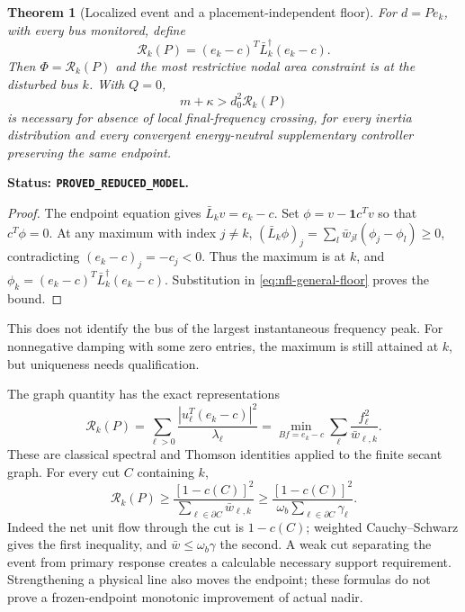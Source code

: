\documentclass[11pt]{article}
\newtheorem{theorem}{Theorem}
\newcommand{\one}{\mathbf{1}}
\newcommand{\status}[1]{\par\smallskip\noindent\textbf{Status: \texttt{#1}.}\ }
\begin{document}
\begin{theorem}[Localized event and a placement-independent floor]
For $d=P e_k$, with every bus monitored, define
\begin{equation}
 \mathcal R_k(P)=(e_k-c)^T\bar L_k^\dagger(e_k-c).
 \label{eq:nfl-resistance}
\end{equation}
Then $\Phi=\mathcal R_k(P)$ and the most restrictive nodal \emph{area}
constraint is at the disturbed bus $k$. With $Q=0$,
\begin{equation}
 \boxed{m+\kappa>d_0^2\mathcal R_k(P)}
 \label{eq:nfl-local-floor}
\end{equation}
is necessary for absence of local final-frequency crossing, for every
inertia distribution and every convergent energy-neutral supplementary
controller preserving the same endpoint.
\end{theorem}
\status{PROVED\_REDUCED\_MODEL}
\begin{proof}
The endpoint equation gives $\bar L_kv=e_k-c$.
Set $\phi=v-\one c^Tv$ so that $c^T\phi=0$.
At any maximum with index $j\ne k$,
$(\bar L_k\phi)_j=\sum_l\bar w_{jl}(\phi_j-\phi_l)\geq0$,
contradicting $(e_k-c)_j=-c_j<0$.
Thus the maximum is at $k$, and
$\phi_k=(e_k-c)^T\bar L_k^\dagger(e_k-c)$.
Substitution in \eqref{eq:nfl-general-floor} proves the bound.
\end{proof}
This does not identify the bus of the largest instantaneous frequency peak.
For nonnegative damping with some zero entries, the maximum is still
attained at $k$, but uniqueness needs qualification.

The graph quantity has the exact representations
\begin{equation}
 \mathcal R_k(P)=
 \sum_{\ell>0}\frac{|u_\ell^T(e_k-c)|^2}{\lambda_\ell}
 =\min_{Bf=e_k-c}\sum_\ell\frac{f_\ell^2}{\bar w_{\ell,k}}.
 \label{eq:nfl-gsp-flow}
\end{equation}
These are classical spectral and Thomson identities applied to the
finite secant graph. For every cut $C$ containing $k$,
\begin{equation}
 \mathcal R_k(P)\geq
 \frac{[1-c(C)]^2}{\sum_{\ell\in\partial C}\bar w_{\ell,k}}
 \geq\frac{[1-c(C)]^2}
                {\omega_b\sum_{\ell\in\partial C}\gamma_\ell}.
 \label{eq:nfl-cut}
\end{equation}
Indeed the net unit flow through the cut is $1-c(C)$; weighted
Cauchy--Schwarz gives the first inequality, and $\bar w\leq\omega_b\gamma$
the second. A weak cut separating the event from primary response creates
a calculable necessary support requirement. Strengthening a physical line
also moves the endpoint; these formulas do not prove a frozen-endpoint
monotonic improvement of actual nadir.
\end{document}
